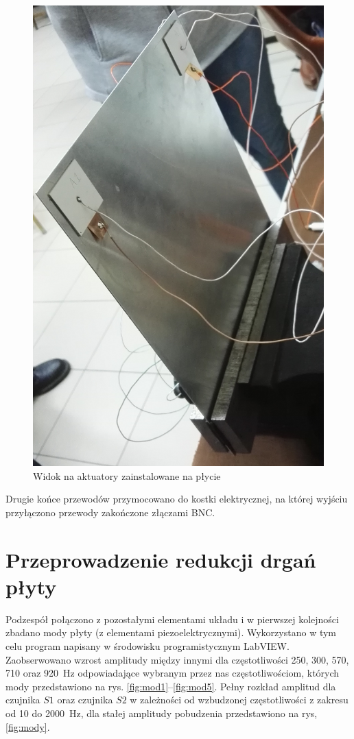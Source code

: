 \documentclass[polish,a4paper,11pt]{mwart}
\let\Oldsection\section
\renewcommand{\section}{\FloatBarrier\Oldsection}
\begin{document}
\begin{figure}[!tbh]
  \centering
  \includegraphics[width=\textwidth]{./bitgraphics/plate2.jpg}
  \caption{Widok na aktuatory zainstalowane na płycie}
  \label{fig:plate2}
\end{figure}

Drugie końce przewodów przymocowano do kostki elektrycznej, na której wyjściu
przyłączono przewody zakończone złączami BNC.

\section{Przeprowadzenie redukcji drgań płyty}

Podzespół połączono z pozostałymi elementami układu i w pierwszej kolejności
zbadano mody płyty (z elementami piezoelektrycznymi). Wykorzystano w tym celu
program napisany w środowisku programistycznym LabVIEW. Zaobserwowano wzrost
amplitudy między innymi dla częstotliwości 250, 300, 570, 710 oraz
\SI{920}{\hertz} odpowiadające wybranym przez nas częstotliwościom, których
mody przedstawiono na rys. \ref{fig:mod1}--\ref{fig:mod5}. Pełny rozkład
amplitud dla czujnika $S1$ oraz czujnika $S2$ w zależności od wzbudzonej
częstotliwości z zakresu od 10 do \SI{2000}{\hertz}, dla stałej amplitudy
pobudzenia przedstawiono na rys, \ref{fig:mody}.
\end{document}
